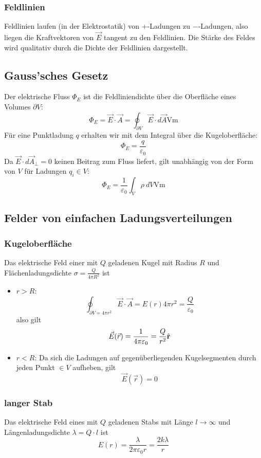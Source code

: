 \subsubsection{Feldlinien}
Feldlinien laufen (in der Elektrostatik) von $+$-Ladungen zu $-$-Ladungen, also liegen die Kraftvektoren von $\vec{E}$ tangent zu den Feldlinien. Die Stärke des Feldes wird qualitativ durch die Dichte der Feldlinien dargestellt.
\subsection{Gauss'sches Gesetz}
Der elektrische Fluss $\Phi_E$ ist die Feldliniendichte über die Oberfläche eines Volumes $\partial V$:
\[\Phi_E = \vec{E} \cdot \vec{A} = \oint_{\partial V}\vec{E}\cdot d\vec{A}\unit{\volt\meter}\]
Für eine Punktladung $q$ erhalten wir mit dem Integral über die Kugeloberfläche:
\[\Phi_E = \frac{q}{\varepsilon_0}\]
Da $\vec{E} \cdot d\vec{A}_\perp = 0$ keinen Beitrag zum Fluss liefert, gilt unabhängig von der Form von $V$ für Ladungen $q_i \in V$:
\[\Phi_E = \frac{1}{\varepsilon_0}\int_{V}\rho \ dV \unit{\volt\meter}\]

\subsection{Felder von einfachen Ladungsverteilungen}
\subsubsection{Kugeloberfläche}
Das elektrische Feld einer mit $Q$ geladenen Kugel mit Radius $R$ und Flächenladungsdichte $\sigma = \frac{Q}{4\pi R^2}$ ist
\begin{itemize}
    \item $r>R$: $$\oint_{\partial V = 4\pi r^2}\Vec{E}\cdot \Vec{A} = E(r) 4\pi r^2 = \frac{Q}{\varepsilon_0}$$
    also gilt
    $$\Vec{E}(\Vec{r}) = \frac{1}{4\pi \varepsilon_0} = \frac{Q}{r^2}\hat{\mathbf{r}}$$
    \item $r<R$: Da sich die Ladungen auf gegenüberliegenden Kugelsegmenten durch jeden Punkt $\in V$ aufheben, gilt $$\Vec{E}(\Vec{r}) = 0$$
\end{itemize}

\subsubsection{langer Stab}
Das elektrische Feld eines mit $Q$ geladenen Stabs mit Länge $l \to \infty$ und Längenladungsdichte $\lambda = Q \cdot l$ ist
$$E(r) = \frac{\lambda}{2\pi \varepsilon_0 r} = \frac{2k\lambda}{r} $$

